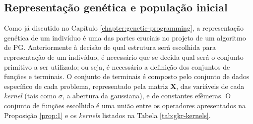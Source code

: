 


\subsection{Representação genética e população inicial}
Como já discutido no Capítulo \ref{chapter:genetic-programming}, a representação genética de um indivíduo é uma das partes cruciais no projeto de um algoritmo de PG. Anteriormente à decisão de qual estrutura será escolhida para representação de um indivíduo, é necessário que se decida qual será o conjunto primitivo a ser utilizado; ou seja, é necessário a definição dos conjuntos de funções e terminais. O conjunto de terminais é composto pelo conjunto de dados específico de cada problema, representado pela matriz $\mathbf{X}$, das variáveis de cada \textit{kernel} (tais como $\sigma$, a abertura da gaussiana), e de constantes efêmeras. O conjunto de funções escolhido é uma união entre os operadores apresentados na Proposição \ref{prop:1} e os \textit{kernels} listados na Tabela \ref{tab:gkr-kernels}.


